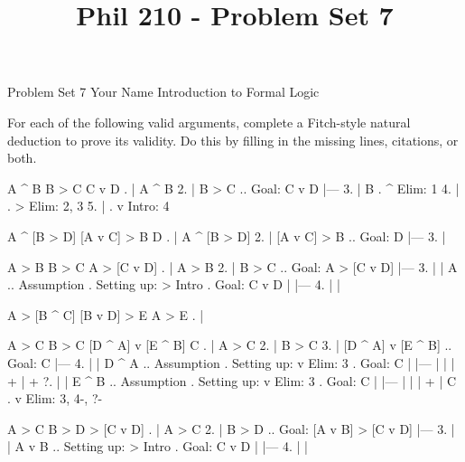 
\title{Phil 210 - Problem Set 7}

\heading
Problem Set 7
Your Name
Introduction to Formal Logic
\endheading

For each of the following valid arguments, complete a Fitch-style natural deduction to prove its validity. Do this by filling in the missing lines, citations, or both.

\problems
{}
\argument
 A ^ B
 B > C
\argumentline
 C v D
\endargument
        \answer
        . | A ^ B
         2. | B > C  ..  Goal: C v D
            |---
         3. | B      .  ^ Elim: 1
         4. |        .  > Elim: 2, 3
         5. |        .  v Intro: 4
        \endfitchproof
        \endanswer

\argument
 A ^ [B > D]
 [A v C] > B
\argumentline
 D
\endargument
        \answer
        . | A ^ [B > D]
         2. | [A v C] > B  ..  Goal: D
            |---
         3. | 
        \endfitchproof
        \endanswer

\argument
 A > B
 B > C
\argumentline
 A > [C v D]
\endargument
        \answer
        . | A > B
         2. | B > C        ..  Goal: A > [C v D]
            |---
         3. |   | A        ..  Assumption  .  Setting up: > Intro  .  Goal: C v D
            |   |---
         4. |   | 
        \endfitchproof
        \endanswer

\argument
 A > [B ^ C]
 [B v D] > E
\argumentline
 A > E
\endargument
        \answer
        . | 
        \endfitchproof
        \endanswer

\widerfitchsetup %
\argument
 A > C
 B > C
 [D ^ A] v [E ^ B]
\argumentline
 C
\endargument
        \answer
        . | A > C
         2. | B > C
         3. | [D ^ A] v [E ^ B]  ..  Goal: C
            |---
         4. |   | D ^ A  ..  Assumption  .  Setting up: v Elim: 3  .  Goal: C
            |   |---
            |   | 
            |   +
            |   +
         ?. |   | E ^ B  ..  Assumption  .  Setting up: v Elim: 3  .  Goal: C
            |   |---
            |   | 
            |   +
            | C          .  v Elim: 3, 4-, ?-
        \endfitchproof
        \endanswer

\argument
 A > C
 B > D
\argumentline
 [A v B] > [C v D]
\endargument
        \answer
        . | A > C
         2. | B > D          ..  Goal: [A v B] > [C v D]
            |---
         3. |   | A v B      ..  Setting up: > Intro    .  Goal: C v D
            |   |---
         4. |   | 
        \endfitchproof
        \endanswer


